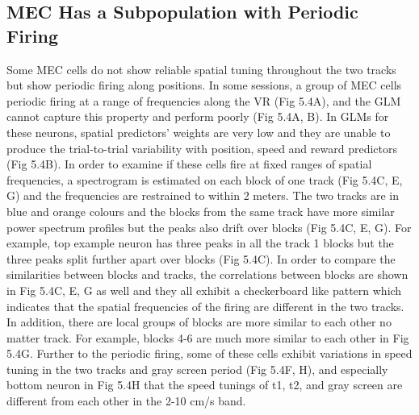 \subsection{MEC Has a Subpopulation with Periodic Firing}
Some MEC cells do not show reliable spatial tuning throughout the two tracks but show periodic firing along positions. In some sessions, a group of MEC cells periodic firing at a range of frequencies along the VR (Fig 5.4A), and the GLM cannot capture this property and perform poorly (Fig 5.4A, B). In GLMs for these neurons, spatial predictors' weights are very low and they are unable to produce the trial-to-trial variability with position, speed and reward predictors (Fig 5.4B). In order to examine if these cells fire at fixed ranges of spatial frequencies, a spectrogram is estimated on each block of one track (Fig 5.4C, E, G) and the frequencies are restrained to within 2 meters. The two tracks are in blue and orange colours and the blocks from the same track have more similar power spectrum profiles but the peaks also drift over blocks (Fig 5.4C, E, G). For example, top example neuron has three peaks in all the track 1 blocks but the three peaks split further apart over blocks (Fig 5.4C). In order to compare the similarities between blocks and tracks, the correlations between blocks are shown in Fig 5.4C, E, G as well and they all exhibit a checkerboard like pattern which indicates that the spatial frequencies of the firing are different in the two tracks. In addition, there are local groups of blocks are more similar to each other no matter track. For example, blocks 4-6 are much more similar to each other in Fig 5.4G. Further to the periodic firing, some of these cells exhibit variations in speed tuning in the two tracks and gray screen period (Fig 5.4F, H), and especially bottom neuron in Fig 5.4H that the speed tunings of t1, t2, and gray screen are different from each other in the 2-10 cm/s band.



